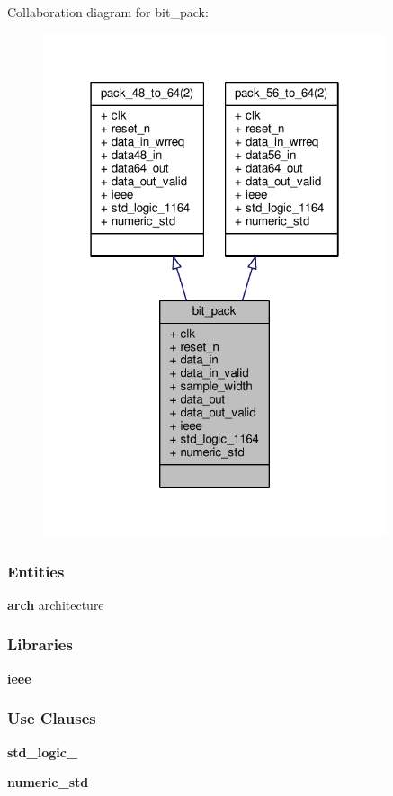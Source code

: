 Collaboration diagram for bit\+\_\+pack\+:\nopagebreak
\begin{figure}[H]
\begin{center}
\leavevmode
\includegraphics[width=286pt]{d1/d66/classbit__pack__coll__graph}
\end{center}
\end{figure}
\subsubsection*{Entities}
\begin{DoxyCompactItemize}
\item 
{\bf arch} architecture
\end{DoxyCompactItemize}
\subsubsection*{Libraries}
 \begin{DoxyCompactItemize}
\item 
{\bf ieee} 
\end{DoxyCompactItemize}
\subsubsection*{Use Clauses}
 \begin{DoxyCompactItemize}
\item 
{\bf std\+\_\+logic\+\_}   
\item 
{\bf numeric\+\_\+std}   
\end{DoxyCompactItemize}
